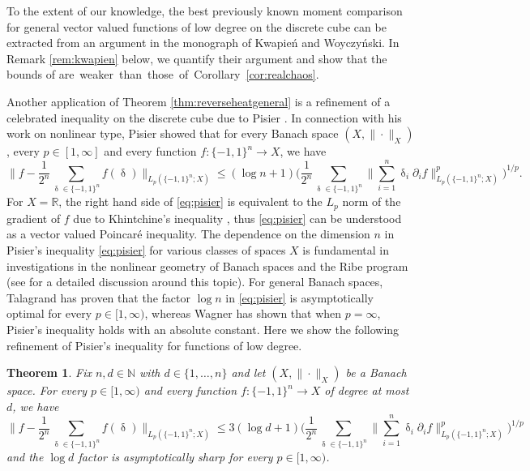 \documentclass[11pt,reqno]{amsart}
\renewcommand{\leq}{\leqslant}
\newcommand{\R}{\mathbb R}
\newcommand{\1}{\mathbf 1}
\newtheorem{theorem}{Theorem}
\theoremstyle{remark}
\newcommand{\N}{\mathbb N}
\renewcommand{\delta}{\updelta}
\begin{document}
To the extent of our knowledge, the best previously known moment comparison for general vector valued functions of low degree on the discrete cube can be extracted from an argument in the monograph \cite{KW92} of Kwapie\'{n} and Woyczy\'{n}ski. In Remark \ref{rem:kwapien} below, we quantify their argument and show that the bounds of \cite[Proposition~6.5.1]{KW92} \mbox{are weaker than those of Corollary \ref{cor:realchaos}.}

Another application of Theorem \ref{thm:reverseheatgeneral} is a refinement of a celebrated inequality on the discrete cube due to Pisier \cite{Pis86}. In connection with his work on nonlinear type, Pisier showed that for every Banach space $(X,\|\cdot\|_X)$, every $p\in[1,\infty]$ and every function $f:\{-1,1\}^n\to X$, we have
\begin{equation} \label{eq:pisier}
\Big\| f - \frac{1}{2^n} \sum_{\delta\in\{-1,1\}^n} f(\delta) \Big\|_{L_p(\{-1,1\}^n;X)} \leq (\log n+1) \Big( \frac{1}{2^n} \sum_{\delta\in\{-1,1\}^n} \Big\| \sum_{i=1}^n \delta_i \partial_i f\Big\|^p_{L_p(\{-1,1\}^n;X)}\Big)^{1/p}.
\end{equation}
For $X=\R$, the right hand side of \eqref{eq:pisier} is equivalent to the $L_p$ norm of the gradient of $f$ due to Khintchine's inequality \cite{Khi23}, thus \eqref{eq:pisier} can be understood as a vector valued Poincar\'e inequality. The dependence on the dimension $n$ in Pisier's inequality \eqref{eq:pisier} for various classes of spaces $X$ is fundamental in investigations in the nonlinear geometry of Banach spaces and the Ribe program (see \cite{Nao12} for a detailed discussion around this topic). For general Banach spaces, Talagrand \cite{Tal93} has proven that the factor $\log n$ in \eqref{eq:pisier} is asymptotically optimal for every $p\in[1,\infty)$, whereas Wagner \cite{Wag00} has shown that when $p=\infty$, Pisier's inequality holds with an absolute constant. Here we show the following refinement of Pisier's inequality for functions of low degree.

\begin{theorem} \label{thm:Pisierlowfreq}
Fix $n,d\in\N$ with $d\in\{1,\ldots,n\}$ and let $(X,\|\cdot\|_X)$ be a Banach space. For every $p\in[1,\infty)$ and every function $f:\{-1,1\}^n \to X$ of degree at most $d$, we have
\begin{equation} \label{eq:Pisierlowfreq}
\Big\| f - \frac{1}{2^n} \sum_{\delta\in\{-1,1\}^n} f(\delta) \Big\|_{L_p(\{-1,1\}^n;X)} \leq 3(\log d+1) \Big( \frac{1}{2^n} \sum_{\delta \in \{-1,1\}^n} \Big\| \sum_{i=1}^n \delta_i \partial_i f \Big\|_{L_p(\{-1,1\}^n;X)}^p\Big)^{1/p}
\end{equation}
and the $\log d$ factor is asymptotically sharp for every $p\in[1,\infty)$.
\end{theorem}
\end{document}
